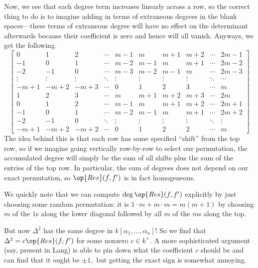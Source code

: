 \documentclass[../notes.tex]{subfiles}
\begin{document}
Now, we see that each degree term increases linearly across a row, so the correct thing to do is to imagine adding in terms of extraneous degrees in the blank spaces---these terms of extraneous degree will have no effect on the determinant afterwards because their coefficient is zero and hence will all vanish. Anyways, we get the following.
\[\begin{bmatrix}
	0      & 1      & 2      & \cdots & m-1    & m      & m+1    & m+2    & \cdots & 2m-1   \\
	-1     & 0      & 1      & \cdots & m-2    & m-1    & m      & m+1    & \cdots & 2m-2   \\
	-2     & -1     & 0      & \cdots & m-3    & m-2    & m-1    & m      & \cdots & 2m-3   \\
	\vdots & \vdots & \vdots & \ddots & \vdots & \vdots & \vdots & \vdots & \ddots & \cdots \\
	-m+1   & -m+2   & -m+3   & \cdots & 0      & 1      & 2      & 3      & \cdots & m      \\
	1      & 2      & 3      & \cdots & m      & m+1    & m+2    & m+3    & \cdots & 2m     \\
	0      & 1      & 2      & \cdots & m-1    & m      & m+1    & m+2    & \cdots & 2m+1   \\
	-1     & 0      & 1      & \cdots & m-2    & m-1    & m      & m+1    & \cdots & 2m+2   \\
	-2     & -1     & 0      & \ddots & \vdots & \vdots & \vdots & \vdots & \ddots & \vdots \\
	-m+1   & -m+2   & -m+2   & \cdots & 0      & 1      & 2      & 2      & \cdots & m  
\end{bmatrix}\]
The idea behind this is that each row has some specified ``shift'' from the top row, so if we imagine going vertically row-by-row to select our permutation, the accumulated degree will simply be the sum of all shifts plus the sum of the entries of the top row. In particular, the sum of degrees does not depend on our exact permutation, so $\op{Res}(f,f')$ is in fact homogeneous.

We quickly note that we can compute $\deg\op{Res}(f,f')$ explicitly by just choosing some random permutation: it is $1\cdot m+m\cdot m=m(m+1)$ by choosing $m$ of the $1$s along the lower diagonal followed by all $m$ of the $m$s along the top.

But now $\Delta^2$ has the same degree in $k[\alpha_1,\ldots,\alpha_n]$! So we find that $\Delta^2=c\op{Res}(f,f')$ for some nonzero $c\in k^\times.$ A more sophisticated argument (say, present in Lang) is able to pin down what the coefficient $c$ should be and can find that it ought be $\pm1,$ but getting the exact sign is somewhat annoying.
\end{document}

